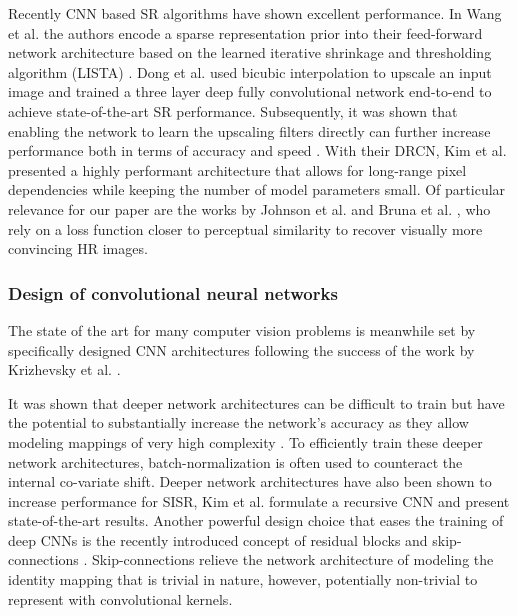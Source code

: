 \documentclass[10pt,twocolumn,letterpaper]{article}
\begin{document}
Recently \ac{CNN} based \ac{SR} algorithms have shown excellent performance.
In Wang et al. \cite{Wang2015} the authors encode a sparse representation prior into their feed-forward network architecture based on the learned iterative shrinkage and thresholding algorithm (LISTA) \cite{gregor2010learning}.
Dong et al. \cite{dong2014learning,dong2016image} used bicubic interpolation to upscale an input image and trained a three layer deep fully convolutional network end-to-end to achieve state-of-the-art \ac{SR} performance.
Subsequently, it was shown that enabling the network to learn the upscaling filters directly can further increase performance both in terms of accuracy and speed \cite{dong2016accelerating,Shi2016ESPCN,Wang2016}.
With their \ac{DRCN}, Kim et al. \cite{kim2016deeply} presented a highly performant architecture that allows for long-range pixel dependencies while keeping the number of model parameters small.
Of particular relevance for our paper are the works by Johnson et al. \cite{Johnson16PercepLoss} and Bruna et al. \cite{bruna2016super}, who rely on a loss function closer to perceptual similarity to recover visually more convincing \ac{HR} images.


\subsubsection{Design of convolutional neural networks}
The state of the art for many computer vision problems is meanwhile set by specifically designed \ac{CNN} architectures following the success of the work by Krizhevsky et al. \cite{krizhevsky2012imagenet}.

It was shown that deeper network architectures can be difficult to train but have the potential to substantially increase the network's accuracy as they allow modeling mappings of very high complexity \cite{simonyan2014very,szegedy2015going}. To efficiently train these deeper network architectures, batch-normalization \cite{Ioffe2015} is often used to counteract the internal co-variate shift.
Deeper network architectures have also been shown to increase performance for \ac{SISR}, \eg Kim et al. \cite{kim2016deeply} formulate a recursive \ac{CNN} and present state-of-the-art results.
Another powerful design choice that eases the training of deep \ac{CNN}s is the recently introduced concept of residual blocks \cite{he2015deep} and skip-connections \cite{he2016identity,kim2016deeply}. Skip-connections relieve the network architecture of modeling the identity mapping that is trivial in nature, however, potentially non-trivial to represent with convolutional kernels.
\end{document}
